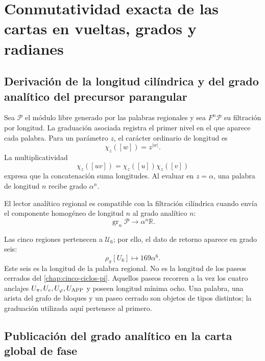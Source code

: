 \section{Conmutatividad exacta de las cartas en vueltas, grados y radianes}
\label{sec:s102:c38:5}

\subsection{Derivación de la longitud cilíndrica y del grado analítico del precursor parangular}
\label{sec:s102:c38:5:1}


Sea \(\mathcal P\) el módulo libre generado por las palabras regionales y
sea \(F^n\mathcal P\) su filtración por longitud. La graduación asociada
registra el primer nivel en el que aparece cada palabra. Para un parámetro
\(z\), el carácter ordinario de longitud es
\[
\chi_z([w])=z^{|w|}.
\]
La multiplicatividad
\[
\chi_z([uv])=\chi_z([u])\chi_z([v])
\]
expresa que la concatenación suma longitudes. Al evaluar en
\(z=\alpha\), una palabra de longitud \(n\) recibe grado \(\alpha^n\).

\begin{definition}
\label{p3-83-c30-s1:def:compatibilidad-grado}
El lector analítico regional es compatible con la filtración cilíndrica
cuando envía el componente homogéneo de longitud \(n\) al grado analítico
\(n\):
\[
\operatorname{gr}_n\mathcal P\longrightarrow
\alpha^n\mathbb R.
\]
\end{definition}

Las cinco regiones pertenecen a \(\mathcal U_6\); por ello, el dato de
retorno aparece en grado seis:
\[
\rho_\pi[U_6]\longmapsto169\alpha^6.
\]
Este seis es la longitud de la palabra regional. No es la longitud de los
paseos cerrados del \cref{chap:cinco-ciclos-pi}. Aquellos paseos recorren a
la vez los cuatro anclajes
\(U_\pi,U_e,U_\varphi,U_{\rm APP}\) y poseen longitud mínima ocho. Una
palabra, una arista del grafo de bloques y un paseo cerrado son objetos de
tipos distintos; la graduación utilizada aquí pertenece al primero.

\subsection{Publicación del grado analítico en la carta global de fase}
\label{sec:s102:c38:5:2}

